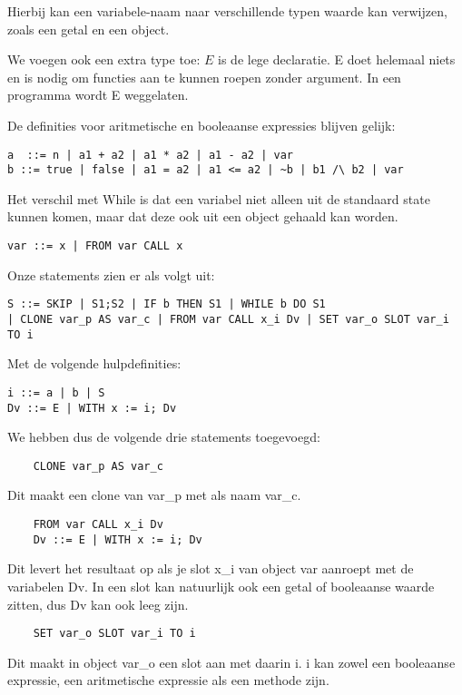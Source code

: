 \documentclass[12pt]{article}
\begin{document}
Hierbij kan een variabele-naam naar verschillende typen waarde kan verwijzen, zoals een getal en een object.

We voegen ook een extra type toe:
$E$ is de lege declaratie. E doet helemaal niets en is nodig om functies aan te kunnen roepen zonder argument.
In een programma wordt E weggelaten.


De definities voor aritmetische en booleaanse expressies blijven gelijk: 
\begin{lstlisting}
a  ::= n | a1 + a2 | a1 * a2 | a1 - a2 | var
b ::= true | false | a1 = a2 | a1 <= a2 | ~b | b1 /\ b2 | var 
\end{lstlisting}

Het verschil met While is dat een variabel niet alleen uit de standaard state kunnen komen, maar dat deze ook uit een object gehaald kan worden. 
\begin{lstlisting}
var ::= x | FROM var CALL x
\end{lstlisting}

Onze statements zien er als volgt uit: 
\begin{lstlisting}
S ::= SKIP | S1;S2 | IF b THEN S1 | WHILE b DO S1
| CLONE var_p AS var_c | FROM var CALL x_i Dv | SET var_o SLOT var_i TO i
\end{lstlisting}

Met de volgende hulpdefinities: 
\begin{lstlisting}
i ::= a | b | S
Dv ::= E | WITH x := i; Dv
\end{lstlisting}

We hebben dus de volgende drie statements toegevoegd: 
\begin{lstlisting}
	CLONE var_p AS var_c
\end{lstlisting} 
Dit maakt een clone van var\_p met als naam var\_c. 

\begin{lstlisting}
	FROM var CALL x_i Dv
	Dv ::= E | WITH x := i; Dv
\end{lstlisting}
Dit levert het resultaat op als je slot x\_i van object var aanroept met de variabelen Dv. In een slot kan natuurlijk ook een getal of booleaanse waarde zitten, dus Dv kan ook leeg zijn. 

\begin{lstlisting}
	SET var_o SLOT var_i TO i
\end{lstlisting} 
Dit maakt in object var\_o een slot aan met daarin i. i kan zowel een booleaanse expressie, een aritmetische expressie als een methode zijn. 
\end{document}
